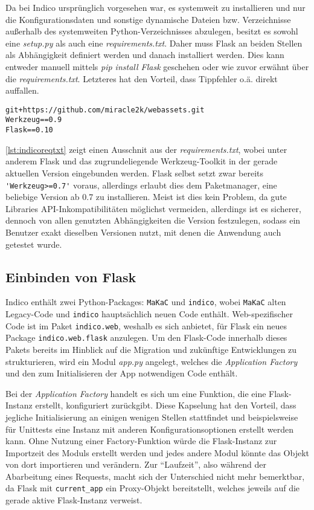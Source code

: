 Da bei Indico ursprünglich vorgesehen war, es systemweit zu installieren und nur die
Konfigurationsdaten und sonstige dynamische Dateien bzw. Verzeichnisse außerhalb des systemweiten
Python-Verzeichnisses abzulegen, besitzt es sowohl eine \emph{setup.py} als auch eine
\emph{requirements.txt}. Daher muss Flask an beiden Stellen als Abhängigkeit definiert werden und
danach installiert werden. Dies kann entweder manuell mittels \emph{pip install Flask} geschehen
oder wie zuvor erwähnt über die \emph{requirements.txt}. Letzteres hat den Vorteil, dass Tippfehler
o.ä. direkt auffallen.

\begin{lstlisting}[caption=Auszug aus der requirements.txt von Indico,label=lst:indicoreqtxt]
git+https://github.com/miracle2k/webassets.git
Werkzeug==0.9
Flask==0.10
\end{lstlisting}

\autoref{lst:indicoreqtxt} zeigt einen Ausschnit aus der \emph{requirements.txt}, wobei unter
anderem Flask und das zugrundeliegende Werkzeug-Toolkit in der gerade aktuellen Version eingebunden
werden. Flask selbst setzt zwar bereits \lstinline{'Werkzeug>=0.7'} voraus, allerdings erlaubt dies
dem Paketmanager, eine beliebige Version ab 0.7 zu installieren. Meist ist dies kein Problem, da
gute Libraries API-Inkompatibilitäten möglichst vermeiden, allerdings ist es sicherer, dennoch von
allen genutzten Abhängigkeiten die Version festzulegen, sodass ein Benutzer exakt dieselben
Versionen nutzt, mit denen die Anwendung auch getestet wurde.


\subsection{Einbinden von Flask}

Indico enthält zwei Python-Packages: \lstinline{MaKaC} und \lstinline{indico}, wobei
\lstinline{MaKaC} alten Legacy-Code und \lstinline{indico} hauptsächlich neuen Code enthält.
Web-spezifischer Code ist im Paket \lstinline{indico.web}, weshalb es sich anbietet, für Flask ein
neues Package \lstinline{indico.web.flask} anzulegen. Um den Flask-Code innerhalb dieses Pakets
bereits im Hinblick auf die Migration und zukünftige Entwicklungen zu strukturieren, wird ein Modul
\emph{app.py} angelegt, welches die \emph{Application Factory} und den zum Initialisieren der App
notwendigen Code enthält.

Bei der \emph{Application Factory} handelt es sich um eine Funktion, die eine Flask-Instanz
erstellt, konfiguriert zurückgibt. Diese Kapselung hat den Vorteil, dass jegliche Initialisierung an
einigen wenigen Stellen stattfindet und beispielsweise für Unittests eine Instanz mit anderen
Konfigurationsoptionen erstellt werden kann. Ohne Nutzung einer Factory-Funktion würde die
Flask-Instanz zur Importzeit des Moduls erstellt werden und jedes andere Modul könnte das Objekt von
dort importieren und verändern. Zur \enquote{Laufzeit}, also während der Abarbeitung eines Requests,
macht sich der Unterschied nicht mehr bemerktbar, da Flask mit \lstinline{current_app} ein
Proxy-Objekt bereitstellt, welches jeweils auf die gerade aktive Flask-Instanz verweist.

